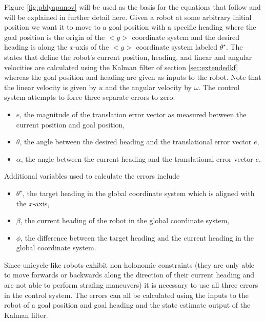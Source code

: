 Figure \ref{fig:pblyapunov} will be used as the basis for the equations that follow and will be explained in further detail here. Given a robot at some arbitrary initial position we want it to move to a goal position with a specific heading where the goal position is the origin of the $<g>$ coordinate system and the desired heading is along the $x$-axis of the $<g>$ coordinate system labeled $\theta^\star$. The states that define the robot's current position, heading, and linear and angular velocities are calculated using the Kalman filter of section \ref{sec:extendedkf} whereas the goal position and heading are given as inputs to the robot. Note that the linear velocity is given by $u$ and the angular velocity by $\omega$. The control system attempts to force three separate errors to zero:
\begin{itemize}
\item $e$, the magnitude of the translation error vector as measured between the current position and goal position,
\item $\theta$, the angle between the desired heading and the translational error vector $e$,
\item $\alpha$, the angle between the current heading and the translational error vector $e$.
\end{itemize}

Additional variables used to calculate the errors include
\begin{itemize}
\item $\theta^\star$, the target heading in the global coordinate system which is aligned with the $x$-axis,
\item $\beta$, the current heading of the robot in the global coordinate system,
\item $\phi$, the difference between the target heading and the current heading in the global coordinate system.
\end{itemize}

Since unicycle-like robots exhibit non-holonomic constraints (they are only able to move forwards or backwards along the direction of their current heading and are not able to perform strafing maneuvers) it is necessary to use all three errors in the control system. The errors can all be calculated using the inputs to the robot of a goal position and goal heading and the state estimate output of the Kalman filter.

